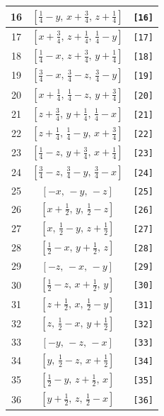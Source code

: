 \documentclass[fleqn,8pt]{jsarticle}
\begin{document}
\begin{longtable}{ccc}
16 & $\left[ \frac{1}{4} - y,\, x + \frac{3}{4},\, z + \frac{1}{4} \right]$ & {\tt [16]} \\ \hline
17 & $\left[ x + \frac{3}{4},\, z + \frac{1}{4},\, \frac{1}{4} - y \right]$ & {\tt [17]} \\ \hline
18 & $\left[ \frac{1}{4} - x,\, z + \frac{3}{4},\, y + \frac{1}{4} \right]$ & {\tt [18]} \\ \hline
19 & $\left[ \frac{3}{4} - x,\, \frac{3}{4} - z,\, \frac{3}{4} - y \right]$ & {\tt [19]} \\ \hline
20 & $\left[ x + \frac{1}{4},\, \frac{1}{4} - z,\, y + \frac{3}{4} \right]$ & {\tt [20]} \\ \hline
21 & $\left[ z + \frac{3}{4},\, y + \frac{1}{4},\, \frac{1}{4} - x \right]$ & {\tt [21]} \\ \hline
22 & $\left[ z + \frac{1}{4},\, \frac{1}{4} - y,\, x + \frac{3}{4} \right]$ & {\tt [22]} \\ \hline
23 & $\left[ \frac{1}{4} - z,\, y + \frac{3}{4},\, x + \frac{1}{4} \right]$ & {\tt [23]} \\ \hline
24 & $\left[ \frac{3}{4} - z,\, \frac{3}{4} - y,\, \frac{3}{4} - x \right]$ & {\tt [24]} \\ \hline
25 & $\left[ - x,\, - y,\, - z \right]$ & {\tt [25]} \\ \hline
26 & $\left[ x + \frac{1}{2},\, y,\, \frac{1}{2} - z \right]$ & {\tt [26]} \\ \hline
27 & $\left[ x,\, \frac{1}{2} - y,\, z + \frac{1}{2} \right]$ & {\tt [27]} \\ \hline
28 & $\left[ \frac{1}{2} - x,\, y + \frac{1}{2},\, z \right]$ & {\tt [28]} \\ \hline
29 & $\left[ - z,\, - x,\, - y \right]$ & {\tt [29]} \\ \hline
30 & $\left[ \frac{1}{2} - z,\, x + \frac{1}{2},\, y \right]$ & {\tt [30]} \\ \hline
31 & $\left[ z + \frac{1}{2},\, x,\, \frac{1}{2} - y \right]$ & {\tt [31]} \\ \hline
32 & $\left[ z,\, \frac{1}{2} - x,\, y + \frac{1}{2} \right]$ & {\tt [32]} \\ \hline
33 & $\left[ - y,\, - z,\, - x \right]$ & {\tt [33]} \\ \hline
34 & $\left[ y,\, \frac{1}{2} - z,\, x + \frac{1}{2} \right]$ & {\tt [34]} \\ \hline
35 & $\left[ \frac{1}{2} - y,\, z + \frac{1}{2},\, x \right]$ & {\tt [35]} \\ \hline
36 & $\left[ y + \frac{1}{2},\, z,\, \frac{1}{2} - x \right]$ & {\tt [36]} \\ \hline

\end{longtable}
\end{document}
